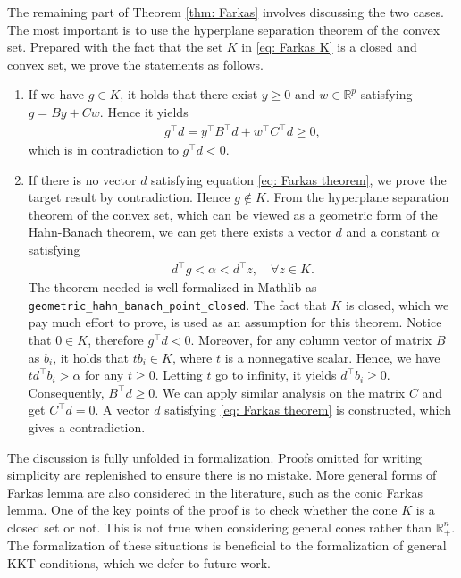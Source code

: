 \documentclass[sn-mathphys]{JORSC-jnl}%
\theoremstyle{thmstyleone}%
\theoremstyle{thmstylethree}%
\newcommand{\lean}[1]{\lstinline[language=lean, mathescape=true]{#1}}
\begin{document}
The remaining part of Theorem \ref{thm: Farkas} involves discussing the two cases. The most important is to use the hyperplane separation theorem of the convex set. Prepared with the fact that the set $K$ in \eqref{eq: Farkas K} is a closed and convex set, we prove the statements as follows.
\begin{enumerate}
    \item If we have $g \in K$, it holds that there exist $y \geq 0$ and $w \in \mathbb{R}^p$ satisfying $g = By + Cw$. Hence it yields 
    \begin{align*}
        g^\top d = y^ \top B^\top d + w^\top C^\top d \geq 0,
    \end{align*}
    which is in contradiction to $g^\top d <0$.
    \item If there is no vector $d$ satisfying equation \eqref{eq: Farkas theorem}, we prove the target result by contradiction. Hence $g \notin K$. From the hyperplane separation theorem of the convex set, which can be viewed as a geometric form of the Hahn-Banach theorem, we can get there exists a vector $d$ and a constant $\alpha$ satisfying 
    \begin{align} \label{eq: separation}
        d^ \top g < \alpha < d^\top z, \quad \forall z \in K.
    \end{align}
    The theorem needed is well formalized in Mathlib as \lean{geometric_hahn_banach_point_closed}. The fact that $K$ is closed, which we pay much effort to prove, is used as an assumption for this theorem. Notice that $0 \in K$, therefore $g^\top d < 0$. Moreover, for any column vector of matrix $B$ as $b_i$, it holds that $tb_i \in K$, where $t$ is a nonnegative scalar. Hence, we have $t d^\top b_i > \alpha$ for any $t \geq 0$. Letting $t$ go to infinity, it yields $d^\top b_i \geq 0$. Consequently, $B^\top d \geq 0$. We can apply similar analysis on the matrix $C$ and get $C^\top d = 0$. A vector $d$ satisfying \eqref{eq: Farkas theorem} is constructed, which gives a contradiction.
\end{enumerate}

The discussion is fully unfolded in formalization. Proofs omitted for writing simplicity are replenished to ensure there is no mistake. More general forms of Farkas lemma are also considered in the literature, such as the conic Farkas lemma. One of the key points of the proof is to check whether the cone $K$ is a closed set or not. This is not true when considering general cones rather than $\mathbb{R}^n_+$. The formalization of these situations is beneficial to the formalization of general KKT conditions, which we defer to future work.   
\end{document}
